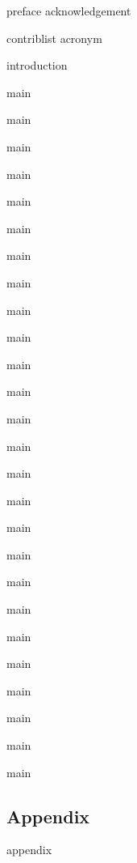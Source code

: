 \documentclass[
graybox,
envcountchap,
tocaftauthskip,
12pt
]{svmult}
\newcommand{\segimport}[2]{\begin{refsegment}{#2}\end{refsegment}}
\begin{document}


\frontmatter%

{preface}
{acknowledgement}

\setcounter{tocdepth}{1}

{\hypersetup{linkcolor=black}\tableofcontents}

{contriblist}
{acronym}

\mainmatter%

\segimport{editor/}{introduction}

{main}
\segimport{Hazard/Earthquake_Ground_Shaking/}{main}
\segimport{Hazard/Earthquake_Surface_Rupture/}{main}
\segimport{Hazard/Earthquake_Liquefaction/}{main}
\segimport{Hazard/Earthquake_Landslide/}{main}
\segimport{Hazard/Storm_Wind/}{main}
\segimport{Hazard/Storm_Surge/}{main}
\segimport{Hazard/Tsunami/}{main}

{main}
\segimport{Response/Structural/}{main}
\segimport{Response/Geotechnical/}{main}
\segimport{Response/CFD_Wind/}{main}
\segimport{Response/CFD_Water/}{main}

{main}
\segimport{Performance/Buildings/}{main}
\segimport{Performance/Transportation/}{main}
\segimport{Performance/Pipelines/}{main}
\segimport{Performance/Power/}{main}

{main}
\segimport{Recovery/Communities/}{main}
\segimport{Recovery/Infrastructure_Systems/}{main}
\segimport{Recovery/Housing/}{main}
\segimport{Recovery/Businesses/}{main}

{main}
\segimport{CrossCutting/Uncertainty/}{main}
\segimport{CrossCutting/AI/}{main}


\backmatter%

\begin{partbacktext}
\part{Appendix}
\appendix
\segimport{editor/}{appendix}
\end{partbacktext}



\printindex

\end{document}
